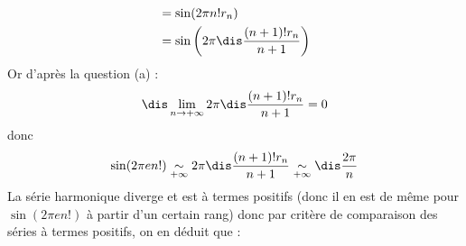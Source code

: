 \documentclass[a4paper,twoside,french,10pt]{VcCours}
\begin{document}
\begin{enumerate}
\begin{enumerate}
\begin{align*}
    & =\sin(2\pi n!r_n) \\
    & =\sin\left(2\pi\dis\frac{(n+1)!r_n}{n+1}\right)
    \end{align*}
    Or d'apr\`es la question (a) :
     $$\dis\lim_{n\to+\infty} 2\pi\dis\frac{(n+1)!r_n}{n+1}=0$$
    donc 
    $$\sin(2\pi e n!) \underset{+ \infty}{\sim} 2\pi\dis\frac{(n+1)!r_n}{n+1}\underset{+ \infty}{\sim}\dis\frac{2\pi}{n}$$
    La série harmonique diverge et est à termes positifs (donc il en est de même pour $\sin(2 \pi e n!)$ à partir d'un certain rang) donc par critère de comparaison des séries à termes positifs, on en déduit que :
    \end{enumerate}
    \end{enumerate}
    
  
\end{document}
